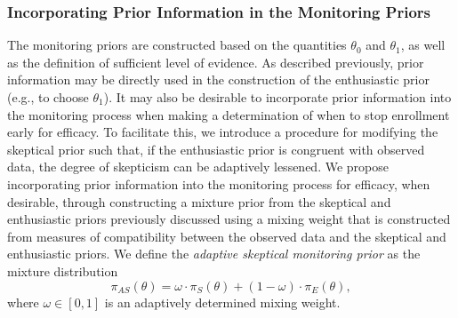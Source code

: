\documentclass[useAMS,usenatbib,referee]{biom}
\begin{document}
\subsubsection{Incorporating Prior Information in the Monitoring Priors}\label{sec:incorporating}
The monitoring priors are constructed based on the quantities $\theta_0$ and $\theta_1$, as well as the definition of sufficient level of evidence. 
%
As described previously, prior information may be directly used in the construction of the enthusiastic prior (e.g., to choose $\theta_1$).
%
It may also be desirable to incorporate prior information into the monitoring process when making a determination of when to stop enrollment 
early for efficacy.
%
To facilitate this, we introduce a procedure for modifying the skeptical prior such that, if the enthusiastic prior is congruent with observed data, the degree of skepticism can be adaptively lessened.
We propose incorporating prior information into the monitoring process for efficacy, when desirable, through constructing a mixture prior
from the skeptical and enthusiastic priors previously discussed using a mixing weight that is constructed from measures of compatibility between the
observed data and the skeptical and enthusiastic priors. 
We define the \textit{adaptive skeptical monitoring prior} as the mixture distribution	
\begin{equation}\label{eq:inference_prior}
	\pi_{AS}\left(\theta\right)=\omega\cdot\pi_{S}\left(\theta\right)+(1-\omega) \cdot \pi_E\left(\theta\right),
\end{equation}
where $\omega\in[0,1]$ is an adaptively determined mixing weight. 
\end{document}
